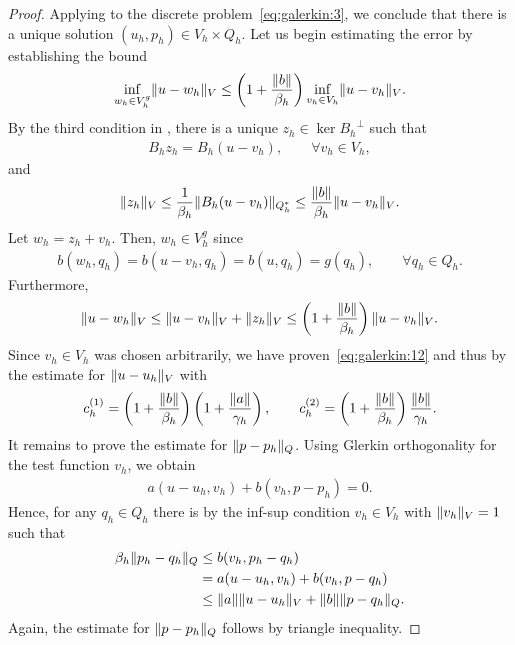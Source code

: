 \begin{proof}
  Applying  to the discrete
  problem~\eqref{eq:galerkin:3}, we conclude that there is a unique
  solution $(u_h,p_h)\in V_h\times Q_h$. Let us begin estimating the
  error by establishing the bound
  \begin{gather}
    \label{eq:galerkin:12}
    \inf_{w_h\in V_h^g} \lVert u-w_h\rVert_V
    \le \left(1+\frac{\lVert b\rVert}{\beta_h}\right)
    \inf_{v_h\in V_h} \lVert u-v_h\rVert_V.
  \end{gather}
  By the third condition in
  , there is a unique
  $z_h\in \ker{B_h}^\perp$ such that
  \begin{gather*}
    B_h z_h = B_h(u-v_h),\qquad \forall v_h\in V_h,
  \end{gather*}
  and
  \begin{gather*}
    \lVert z_h\rVert_V \le \frac1{\beta_h}\lVert B_h(u-v_h)\rVert_{Q_h^*}
    \le\frac{\lVert b\rVert}{\beta_h} \lVert u-v_h\rVert_V.
  \end{gather*}
  Let $w_h = z_h+v_h$. Then,  $w_h\in V_h^g$ since
  \begin{gather*}
    b(w_h, q_h) = b(u-v_h, q_h) = b(u, q_h) = g(q_h),
    \qquad\forall q_h\in Q_h.
  \end{gather*}
  Furthermore,
  \begin{gather*}
    \lVert u-w_h\rVert_V \le \lVert u-v_h\rVert_V + \lVert z_h\rVert_V
    \le \left(1+\frac{\lVert b\rVert}{\beta_h}\right)
    \lVert u-v_h\rVert_V.
  \end{gather*}
  Since $v_h \in V_h$ was chosen arbitrarily, we have
  proven~\eqref{eq:galerkin:12} and thus by
   the estimate for
  $\lVert u-u_h\rVert_V$ with
  \begin{gather}
    c_h^{(1)} = \left(1+\frac{\lVert b\rVert}{\beta_h}\right)
    \left(1+\frac{\lVert a\rVert}{\gamma_h}\right),
    \qquad
    c_h^{(2)} = \left(1+\frac{\lVert b\rVert}{\beta_h}\right)
    \frac{\lVert b\rVert}{\gamma_h}.
  \end{gather}
  It remains to prove the estimate for $\lVert p-p_h\rVert_Q$. Using Glerkin
  orthogonality for the test function $v_h$, we obtain
  \begin{gather}
    \label{eq:galerkin:13}
    a(u-u_h, v_h) + b(v_h, p-p_h) = 0.
  \end{gather}
  Hence, for any $q_h\in Q_h$ there is by the inf-sup condition
  $v_h\in V_h$ with $\lVert v_h\rVert_V=1$ such that
  \begin{align*}
    \beta_h \lVert p_h-q_h\rVert_Q
    &\le b(v_h, p_h-q_h)\\
    & = a(u-u_h, v_h) + b(v_h, p-q_h)\\
    &\le \lVert a\rVert \lVert u-u_h\rVert_V + \lVert b\rVert \lVert p-q_h\rVert_Q.
  \end{align*}
  Again, the estimate for $\lVert p-p_h\rVert_Q$ follows by triangle
  inequality.
\end{proof}

